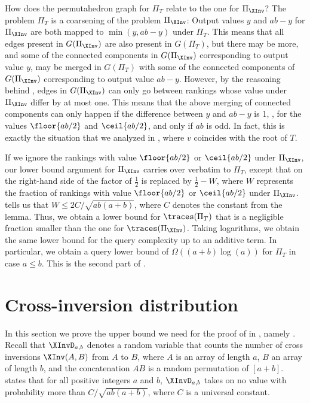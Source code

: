 How does the permutahedron graph for $\Pi_T$ relate to the one for $\Pi_{\XInv}$? The problem $\Pi_T$ is a coarsening of the problem $\Pi_{\XInv}$: Output values $y$ and $ab-y$ for $\Pi_{\XInv}$ are both mapped to $\min(y,ab-y)$ under $\Pi_T$. This means that all edges present in $G(\Pi_{\XInv})$ are also present in $G(\Pi_T)$, but there may be more, and some of the connected components in $G(\Pi_{\XInv})$ corresponding to output value $y$, may be merged in $G(\Pi_T)$ with some of the connected components of $G(\Pi_{\XInv})$ corresponding to output value $ab-y$. However, by the reasoning behind , edges in $G(\Pi_{\XInv})$ can only go between rankings whose value under $\Pi_{\XInv}$ differ by at most one. This means that the above merging of connected components can only happen if the difference between $y$ and $ab-y$ is 1, \ie, for the values $\floor{ab/2}$ and $\ceil{ab/2}$, and only if $ab$ is odd. In fact, this is exactly the situation that we analyzed in , where $v$ coincides with the root of $T$. 

If we ignore the rankings with value $\floor{ab/2}$ or $\ceil{ab/2}$ under $\Pi_{\XInv}$, our lower bound argument for $\Pi_{\XInv}$ carries over verbatim to $\Pi_T$, except that on the right-hand side of  the factor of $\frac{1}{2}$ is replaced by $\frac{1}{2}-W$, where $W$ represents the fraction of rankings with value $\floor{ab/2}$ or $\ceil{ab/2}$ under $\Pi_{\XInv}$.  tells us that $W \le 2C/\sqrt{ab(a+b)}$, where $C$ denotes the constant from the lemma. Thus, we obtain a lower bound for $\traces(\Pi_T)$ that is a negligible fraction smaller than the one for $\traces(\Pi_{\XInv})$. Taking logarithms, we obtain the same lower bound for the query complexity up to an additive term. In particular, we obtain a query lower bound of $\Omega((a+b)\log(a))$ for $\Pi_T$ in case $a \le b$. This is the second part of .



\section{Cross-inversion distribution}
\label{sec:cross-inversions}
%
%
%
%

%
%
%
%
%
%
%
%
%

In this section we prove the upper bound we need for the proof of  in , namely . Recall that $\XInvD_{a,b}$ denotes a random variable that counts the number of cross inversions $\XInv(A,B)$ from $A$ to $B$, where $A$ is an array of length $a$, $B$ an array of length $b$, and the concatenation $AB$ is a random permutation of $[a+b]$.
 states that for all positive integers $a$ and $b$, $\XInvD_{a,b}$ takes on no value with probability more than $C/\sqrt{ab(a+b)}$, where $C$ is a universal constant.

